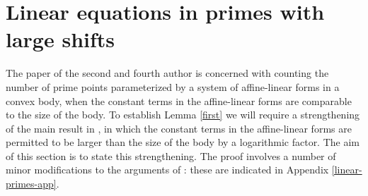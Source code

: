 \documentclass[12pt]{amsart}
\numberwithin{equation}{section}  %
\theoremstyle{remark}
\theoremstyle{plain}
\numberwithin{equation}{section}
\renewcommand{\leq}{\leqslant}
\renewcommand{\(}{\left(}
\renewcommand{\)}{\right)}
\newcommand{\vect}[1]{{\ensuremath{\vec{#1}}}}
\newcommand{\PP}{\mathcal{P}}
\begin{document}
\begin{comment}
Now set
\[ \Sigma := \sum_{i=0}^{r-1}\sum_{q\in R''_2(\vect{\mathbf{a}})}(|\PP_1(q,i;\vect{\mathbf{a}})|-|\PP_2(\vect{\mathbf{a}}) \cap \PP_1(q,i; \vect{\mathbf{a}})|).\]
Unravelling the definitions, $\Sigma$ is counting the number of triples $(i,p,q)$ with $p \in P_0 \setminus P_2(\vect{\mathbf{a}})$, $q \in R''_2(\vect{\mathbf{a}})$, $q - ir! p \in Q_0(p)$ and $q - ir! p,\dots, q + (r - i - 1)r! p \in R'_2(\vect{\mathbf{a}})$. For any such triple we certainly have $q - ir! p \in Q_1(p;\vect{\mathbf{a}})$, and so we have the upper bound
\[ \Sigma \leq r \sum_{p \in P_0 \setminus P_2(\vect{\mathbf{a}})} |Q_1(p;\vect{\mathbf{a}})|.\]
By \eqref{sumoverexceptp}, it follows that
$$\Sigma =
 o\Bigg(\gamma^r\frac{xy}{(\log x)^{r+1}}\bigg),$$ and therefore
\begin{equation}\label{av-a} \sum_{i=0}^{r-1}\big(|\PP_1(q,i;\vect{\mathbf{a}})|-|\PP_2(\vect{\mathbf{a}}) \cap \PP_1(q,i;\vect{\mathbf{a}})|\big) = o\(\gamma^{r-1} \frac{x}{(\log x)^r}\)\end{equation} for all except $o(\gamma y/\log x) = o(x/\log x)$ values of $q \in R''_2(\vect{\mathbf{a}})$. Now \eqref{eq460} and \eqref{av-a} implies the statement \eqref{stronger}, which we are trying to prove, uniformly in $i \in \{0,\dots, r-1\}$. Taking $R''_2$ to consist of the values of $q \in R''_2(\vect{\mathbf{a}})$ for which \eqref{av-a} holds, the proof of Lemma \ref{sieveunited} is complete.
\end{proof}

\end{comment}




\section{Linear equations in primes with large shifts}\label{dickson-shifted-sec}

The paper \cite{gt-linearprimes} of the second and fourth author is concerned with counting the number of prime points parameterized by a system of affine-linear forms in a convex body, when the constant terms in the affine-linear forms are comparable to the size of the body.
To establish Lemma \ref{first} we will require a strengthening of the main result in \cite{gt-linearprimes}, in which the constant terms in the affine-linear forms are permitted to be larger than the size of the body by a logarithmic factor. The aim of this section is to state this strengthening. The proof involves a number of minor modifications to the arguments of \cite{gt-linearprimes}: these are indicated in Appendix \ref{linear-primes-app}.
\end{document}
